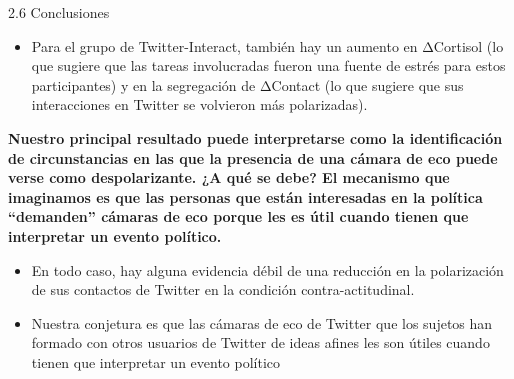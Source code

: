 \documentclass[
  11pt,
  ignorenonframetext,
  aspectratio=169,
]{beamer}
\providecommand{\tightlist}{%
  \setlength{\itemsep}{0pt}\setlength{\parskip}{0pt}}\usepackage{longtable,booktabs,array}
\begin{document}
\begin{frame}{2.6 Conclusiones}
\label{conclusiones-1}
\begin{itemize}
\tightlist
\item
  Para el grupo de Twitter-Interact, también hay un aumento en ΔCortisol
  (lo que sugiere que las tareas involucradas fueron una fuente de
  estrés para estos participantes) y en la segregación de ΔContact (lo
  que sugiere que sus interacciones en Twitter se volvieron más
  polarizadas).
\end{itemize}

\textbf{Nuestro principal resultado puede interpretarse como la
identificación de circunstancias en las que la presencia de una cámara
de eco puede verse como despolarizante. ¿A qué se debe? El mecanismo que
imaginamos es que las personas que están interesadas en la política
``demanden'' cámaras de eco porque les es útil cuando tienen que
interpretar un evento político. }

\begin{itemize}
\tightlist
\item
  En todo caso, hay alguna evidencia débil de una reducción en la
  polarización de sus contactos de Twitter en la condición
  contra-actitudinal.
\item
  Nuestra conjetura es que las cámaras de eco de Twitter que los sujetos
  han formado con otros usuarios de Twitter de ideas afines les son
  útiles cuando tienen que interpretar un evento político
\end{itemize}
\end{frame}
\end{document}
